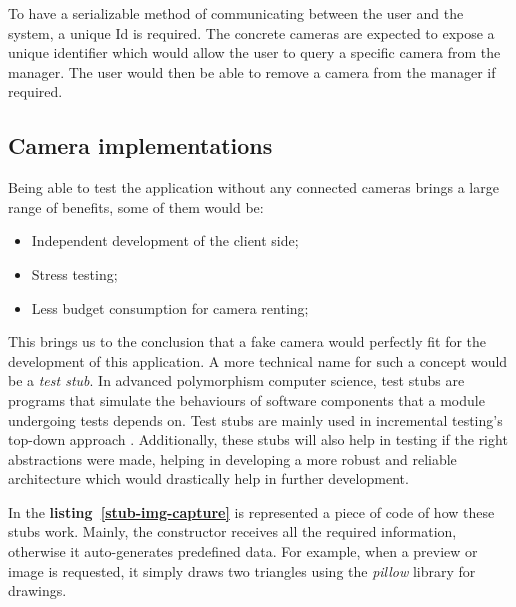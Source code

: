 \vspace{0.3cm}
To have a serializable method of communicating between the user and the system, a unique Id is required. The concrete cameras are expected to expose a unique identifier which would allow the user to query a specific camera from the manager. The user would then be able to remove a camera from the manager if required.

\vspace{0.3cm}
\subsection{Camera implementations}
Being able to test the application without any connected cameras brings a large range of benefits, some of them would be:

\begin{itemize}
    \item Independent development of the client side;
    \item Stress testing;
    \item Less budget consumption for camera renting;
\end{itemize}

\vspace{0.3cm}
This brings us to the conclusion that a fake camera would perfectly fit for the development of this application. A more technical name for such a concept would be a \textit{test stub}. In advanced polymorphism computer science, test stubs are programs that simulate the behaviours of software components that a module undergoing tests depends on. Test stubs are mainly used in incremental testing's top-down approach \cite{test-stub}. Additionally, these stubs will also help in testing if the right abstractions were made, helping in developing a more robust and reliable architecture which would drastically help in further development.

\vspace{0.3cm}
In the \textbf{\mbox{listing \ref{stub-img-capture}}} is represented a piece of code of how these stubs work. Mainly, the constructor receives all the required information, otherwise it auto-generates predefined data. For example, when a preview or image is requested, it simply draws two triangles using the \textit{pillow} library for drawings.

\vspace{0.3cm}


